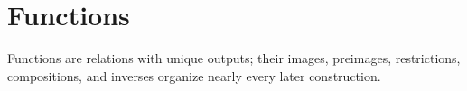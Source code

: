 \section{Functions}

Functions are relations with unique outputs; their images, preimages, restrictions, compositions, and inverses organize nearly every later construction.






